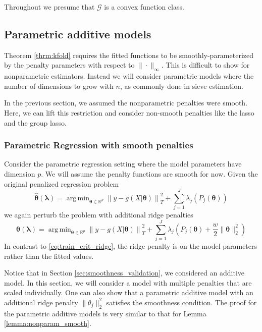 \documentclass[12pt]{article}
\DeclareMathOperator*{\argmin}{arg\,min}
\begin{document}
Throughout we presume that $\mathcal{G}$ is a convex function class.

\subsection{Parametric additive models}
\label{sec:smoothness_domain}

Theorem \ref{thrm:kfold} requires the fitted functions to be smoothly-parameterized by the penalty parameters with respect to $\| \cdot \|_\infty$. This is difficult to show for nonparametric estimators. Instead we will consider parametric models where the number of dimensions to grow with $n$, as commonly done in sieve estimation.

In the previous section, we assumed the nonparametric penalties were smooth. Here, we can lift this restriction and consider non-smooth penalties like the lasso and the group lasso.

\subsubsection{Parametric Regression with smooth penalties}
Consider the parametric regression setting where the model parameters have dimension $p$. We will assume the penalty functions are smooth for now. Given the original penalized regression problem
\begin{equation}
\hat{\boldsymbol{\theta}}(\boldsymbol{\lambda}) = \argmin_{\boldsymbol{\theta} \in \mathbb{R}^p} 
\left  \| y -  g(X| \boldsymbol{\theta}) \right \|^2_T 
+ \sum_{j=1}^J \lambda_j \left ( P_j(\boldsymbol{\theta})\right )
\end{equation}
we again perturb the problem with additional ridge penalties
\begin{equation}
\label{eq:param_ridge}
\hat{\boldsymbol{\theta}}(\boldsymbol{\lambda}) = \argmin_{\boldsymbol{\theta }\in \mathbb{R}^p} 
\left  \| y -  g(X| \boldsymbol{\theta}) \right \|^2_T 
+ \sum_{j=1}^J \lambda_j \left ( P_j(\boldsymbol{\theta}) + \frac{w}{2} \| \boldsymbol{\theta} \|^2_2 \right )
\end{equation}
In contrast to \eqref{eq:train_crit_ridge}, the ridge penalty is on the model parameters rather than the fitted values.

Notice that in Section \ref{sec:smoothness_validation}, we considered an additive model. In this section, we will consider a model with multiple penalties that are scaled individually. One can also show that a parametric additive model with an additional ridge penalty $\| \theta_j\|^2_2$ satisfies the smoothness condition. The proof for the parametric additive models is very similar to that for Lemma \ref{lemma:nonparam_smooth}.
\end{document}
